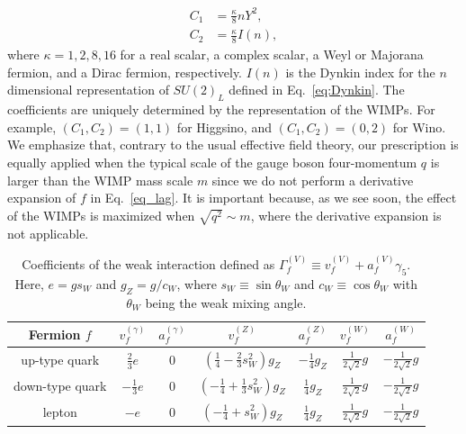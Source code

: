 \documentclass[12pt,twoside,book]{article}
\begin{document}
\begin{align}
 C_1 &= \frac{\kappa}{8} n Y^2,\label{eq_C1}\\
 C_2 &= \frac{\kappa}{8} I(n),\label{eq_C2}
\end{align}
where $\kappa = 1, 2, 8, 16$ for a real scalar, a complex scalar, a Weyl or Majorana fermion, and a Dirac fermion, respectively.
$I(n)$ is the Dynkin index for the $n$ dimensional representation of $SU(2)_L$ defined in Eq.~\eqref{eq:Dynkin}.
The coefficients are uniquely determined by the representation of the WIMPs.
For example, $(C_1, C_2) = (1, 1)$ for Higgsino, and $(C_1, C_2) = (0, 2)$ for Wino.
We emphasize that, contrary to the usual effective field theory, our prescription is equally applied when the typical scale of the gauge boson four-momentum $q$ is larger than the WIMP mass scale $m$ since we do not perform a derivative expansion of $f$ in
Eq.~\eqref{eq_lag}.
It is important because, as we see soon, the effect of the WIMPs is maximized when $\sqrt{q^2}\sim m$, where the derivative expansion is not applicable.

\begin{table}[t]
  \centering
  \def\arraystretch{1.2}
  \begin{tabular}{c|cccccc}
    Fermion $f$ & $v_f^{(\gamma)}$ & $a_f^{(\gamma)}$ & $v_f^{(Z)}$ & $a_f^{(Z)}$ & $v_f^{(W)}$ & $a_f^{(W)}$ \\ \hline
    up-type quark & $\frac{2}{3}e$ & 0 & $(\frac{1}{4}-\frac{2}{3}s_W^2) g_Z$ & $-\frac{1}{4}g_Z$ & $\frac{1}{2\sqrt{2}}g$ & $-\frac{1}{2\sqrt{2}}g$ \\
    down-type quark & $-\frac{1}{3}e$ & 0 & $(-\frac{1}{4}+\frac{1}{3}s_W^2)g_Z$ & $\frac{1}{4}g_Z$ & $\frac{1}{2\sqrt{2}}g$ & $-\frac{1}{2\sqrt{2}}g$ \\
    lepton & $-e$ & 0 & $(-\frac{1}{4}+s_W^2)g_Z$ & $\frac{1}{4}g_Z$ & $\frac{1}{2\sqrt{2}}g$ & $-\frac{1}{2\sqrt{2}}g$ \\
  \end{tabular}
  \caption{Coefficients of the weak interaction defined as
    $\Gamma_f^{(V)} \equiv v_f^{(V)} + a_f^{(V)} \gamma_5$.  Here, $e = g
    s_W$ and $g_Z = g / c_W$, where $s_W \equiv \sin \theta_W$ and $c_W
    \equiv \cos \theta_W$ with $\theta_W$ being the weak mixing angle.}
  \label{table_weak}
\end{table}
\end{document}

